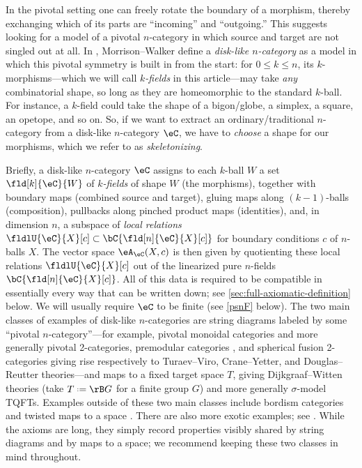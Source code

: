 \documentclass[12pt,reqno]{amsart}
\newcommand{\A}{\eA}
\newcommand{\C}{\eC}
\newcommand{\defn}[1]{\emph{#1}}
\DeclareRobustCommand{\coloneq}{\mathrel{\vcenter{\baselineskip0.5ex\lineskiplimit0pt\hbox{\scriptsize{\upshape.}}\hbox{\scriptsize{\upshape.}}}}=}
\begin{document}
In the pivotal setting one can freely rotate the boundary of a morphism, thereby exchanging which of its parts are ``incoming'' and ``outgoing.'' This suggests looking for a model of a pivotal $n$-category in which source and target are not singled out at all. In \cite{MW12}, Morrison--Walker define a \defn{disk-like $n$-category} as a model in which this pivotal symmetry is built in from the start: for $0\leq k\leq n$, its $k$-morphisms---which we will call \defn{$k$-fields} in this article---may take \emph{any} combinatorial shape, so long as they are homeomorphic to the standard $k$-ball. For instance, a $k$-field could take the shape of a bigon/globe, a simplex, a square, an opetope, and so on. So, if we want to extract an ordinary/traditional $n$-category from a disk-like $n$-category $\C$, we have to \emph{choose} a shape for our morphisms, which we refer to as \defn{skeletonizing}.

Briefly, a disk-like $n$-category $\C$ assigns to each $k$-ball $W$ a set $\fld[k]{\C}{W}$ of \defn{$k$-fields} of shape $W$ (the morphisms), together with boundary maps (combined source and target), gluing maps along $(k-1)$-balls (composition), pullbacks along pinched product maps (identities), and, in dimension $n$, a subspace of \defn{local relations} $\fldlU{\C}{X}[c]\subset\bC\{\fld[n]{\C}{X}[c]\}$ for boundary conditions $c$ of $n$-balls $X$. The vector space $\A_\C(X,c)$ is then given by quotienting these local relations $\fldlU{\C}{X}[c]$ out of the linearized pure $n$-fields $\bC\{\fld[n]{\C}{X}[c]\}$. All of this data is required to be compatible in essentially every way that can be written down; see \cref{sec:full-axiomatic-definition} below. We will usually require $\C$ to be finite (see \cref{psnF} below). The two main classes of examples of disk-like $n$-categories are string diagrams labeled by some ``pivotal $n$-category''---for example, pivotal monoidal categories and more generally pivotal 2-categories, premodular categories \cite{W14premodular}, and spherical fusion 2-categories \cite{DR18} giving rise respectively to Turaev--Viro, Crane--Yetter, and Douglas--Reutter theories---and maps to a fixed target space $T$, giving Dijkgraaf--Witten theories (take $T\coloneq\rB G$ for a finite group $G$) and more generally $\sigma$-model TQFTs. Examples outside of these two main classes include bordism categories \cite[Exm. 6.2.6]{MW12} and twisted maps to a space \cite[Exm. 6.2.3]{MW12}. There are also more exotic examples; see \cite{walkeruscslides,W09fields}. 
While the axioms are long, they simply record properties visibly shared by string diagrams and by maps to a space; we recommend keeping these two classes in mind throughout.
\end{document}
